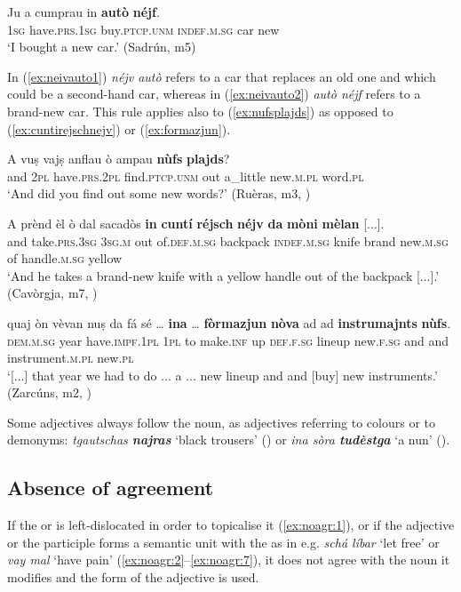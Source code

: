 \ea
\label{ex:neivauto2}
\gll Ju a cumprau in \textbf{autò} \textbf{néjf}.\\
\textsc{1sg} have\textsc{.prs.1sg} buy.\textsc{ptcp.unm} \textsc{indef.m.sg} car new\\
\glt `I bought a new car.' (Sadrún, m5)
\z

In (\ref{ex:neivauto1}) \textit{néjv autò} refers to a car that replaces an old one and which could be a second-hand car, whereas in (\ref{ex:neivauto2}) \textit{autò néjf} refers to a brand-new car. This rule applies also to (\ref{ex:nufsplajds}) as opposed to (\ref{ex:cuntirejschnejv}) or (\ref{ex:formazjun}).

\ea
\label{ex:nufsplajds}
\gll A vuṣ vajṣ anflau ò ampau \textbf{nùfs} \textbf{plajds}?    \\
and \textsc{2pl} have.\textsc{prs.2pl} find.\textsc{ptcp.unm} out a\_little new.\textsc{m.pl} word.\textsc{pl}\\
\glt `And did you find out some new words?' (Ruèras, m3, )
\z

\ea
\label{ex:cuntirejschnejv}
\gll A prènd èl ò dal sacadòs \textbf{in} \textbf{cuntí} \textbf{réjsch} \textbf{néjv} \textbf{da} \textbf{mòni} \textbf{mèlan} [...].\\
and take.\textsc{prs.3sg} \textsc{3sg.m} out of.\textsc{def.m.sg} backpack \textsc{indef.m.sg} knife brand new.\textsc{m.sg} of handle.\textsc{m.sg} yellow\\
\glt `And he takes a brand-new knife with a yellow handle out of the backpack [...].' (Cavòrgja, m7, )
\z

\ea
\label{ex:formazjun}
\gll  [...] quaj òn vèvan nuṣ da fá sé … \textbf{ina} … \textbf{fòrmazjun} \textbf{nòva} ad ad \textbf{instrumajnts} \textbf{nùfs}.\\
{} \textsc{dem.m.sg} year have.\textsc{impf.1pl} \textsc{1pl} to make.\textsc{inf} up {} \textsc{def.f.sg} {} lineup  new.\textsc{f.sg} and and instrument.\textsc{m.pl} new.\textsc{pl}\\
\glt `[...] that year we had to do ... a ... new lineup and and [buy] new instruments.' (Zarcúns, m2, )
\z

Some adjectives always follow the noun, as adjectives referring to colours or to demonyms: \textit{tgautschas \textbf{najras}} `black trousers' () or \textit{ina sòra \textbf{tudèstga}} `a  nun' ().

\subsection{Absence of agreement}\label{sec:3.3.7}
If the  or  is left-dislocated in order to topicalise it (\ref{ex:noagr:1}), or if the adjective or the participle forms a semantic unit with the  as in e.g. \textit{schá líbar} `let free' or \textit{vay mal} `have pain' (\ref{ex:noagr:2}--\ref{ex:noagr:7}), it does not agree with the noun it modifies and the  form of the adjective is used.

